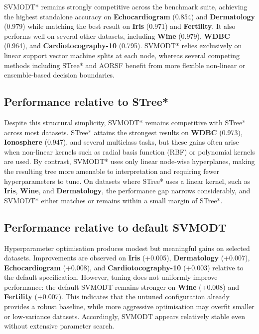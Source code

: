 SVMODT* remains strongly competitive across the benchmark suite, achieving the highest standalone accuracy on \textbf{Echocardiogram} (0.854) and \textbf{Dermatology} (0.979) while matching the best result on \textbf{Iris} (0.971) and \textbf{Fertility}. It also performs well on several other datasets, including \textbf{Wine} (0.979), \textbf{WDBC} (0.964), and \textbf{Cardiotocography-10} (0.795). SVMODT* relies exclusively on linear support vector machine splits at each node, whereas several competing methods including STree* and AORSF benefit from more flexible non-linear or ensemble-based decision boundaries.

\subsection{Performance relative to STree*}\label{performance-relative-to-stree}

Despite this structural simplicity, SVMODT* remains competitive with STree* across most datasets. STree* attains the strongest results on \textbf{WDBC} (0.973), \textbf{Ionosphere} (0.947), and several multiclass tasks, but these gains often arise when non-linear kernels such as radial basis function (RBF) or polynomial kernels are used. By contrast, SVMODT* uses only linear node-wise hyperplanes, making the resulting tree more amenable to interpretation and requiring fewer hyperparameters to tune. On datasets where STree* uses a linear kernel, such as \textbf{Iris}, \textbf{Wine}, and \textbf{Dermatology}, the performance gap narrows considerably, and SVMODT* either matches or remains within a small margin of STree*.

\subsection{Performance relative to default SVMODT}\label{performance-relative-to-default-svmodt}

Hyperparameter optimisation produces modest but meaningful gains on selected datasets. Improvements are observed on \textbf{Iris} (+0.005), \textbf{Dermatology} (+0.007), \textbf{Echocardiogram} (+0.008), and \textbf{Cardiotocography-10} (+0.003) relative to the default specification. However, tuning does not uniformly improve performance: the default SVMODT remains stronger on \textbf{Wine} (+0.008) and \textbf{Fertility} (+0.007). This indicates that the untuned configuration already provides a robust baseline, while more aggressive optimisation may overfit smaller or low-variance datasets. Accordingly, SVMODT appears relatively stable even without extensive parameter search.

